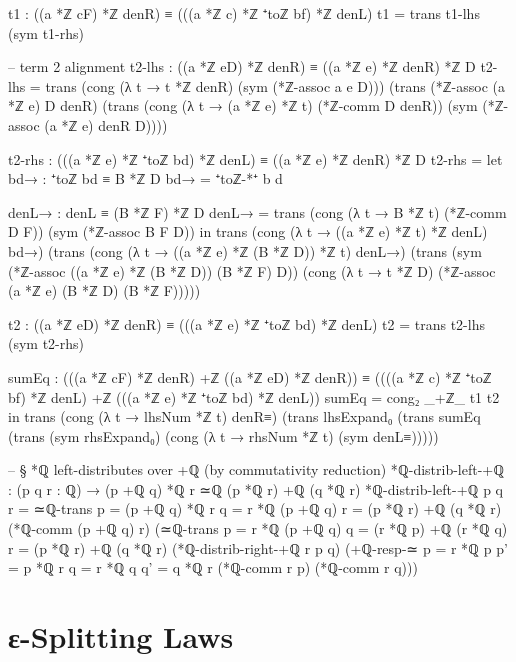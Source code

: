 \documentclass[11pt,a4paper]{book}
\def\texorpdfstring#1#2{#2}%
\begin{document}
\begin{code}
    t1 : ((a *ℤ cF) *ℤ denR) ≡ (((a *ℤ c) *ℤ ⁺toℤ bf) *ℤ denL)
    t1 = trans t1-lhs (sym t1-rhs)

    -- term 2 alignment
    t2-lhs : ((a *ℤ eD) *ℤ denR) ≡ ((a *ℤ e) *ℤ denR) *ℤ D
    t2-lhs =
      trans
          (cong (λ t → t *ℤ denR) (sym (*ℤ-assoc a e D)))
          (trans
            (*ℤ-assoc (a *ℤ e) D denR)
            (trans
              (cong (λ t → (a *ℤ e) *ℤ t) (*ℤ-comm D denR))
              (sym (*ℤ-assoc (a *ℤ e) denR D))))

    t2-rhs : (((a *ℤ e) *ℤ ⁺toℤ bd) *ℤ denL) ≡ ((a *ℤ e) *ℤ denR) *ℤ D
    t2-rhs =
      let
        bd→ : ⁺toℤ bd ≡ B *ℤ D
        bd→ = ⁺toℤ-*⁺ b d

        denL→ : denL ≡ (B *ℤ F) *ℤ D
        denL→ =
          trans
            (cong (λ t → B *ℤ t) (*ℤ-comm D F))
            (sym (*ℤ-assoc B F D))
      in
      trans
        (cong (λ t → ((a *ℤ e) *ℤ t) *ℤ denL) bd→)
        (trans
          (cong (λ t → ((a *ℤ e) *ℤ (B *ℤ D)) *ℤ t) denL→)
          (trans
            (sym (*ℤ-assoc ((a *ℤ e) *ℤ (B *ℤ D)) (B *ℤ F) D))
            (cong (λ t → t *ℤ D) (*ℤ-assoc (a *ℤ e) (B *ℤ D) (B *ℤ F)))))

    t2 : ((a *ℤ eD) *ℤ denR) ≡ (((a *ℤ e) *ℤ ⁺toℤ bd) *ℤ denL)
    t2 = trans t2-lhs (sym t2-rhs)

    sumEq : (((a *ℤ cF) *ℤ denR) +ℤ ((a *ℤ eD) *ℤ denR)) ≡ ((((a *ℤ c) *ℤ ⁺toℤ bf) *ℤ denL) +ℤ (((a *ℤ e) *ℤ ⁺toℤ bd) *ℤ denL))
    sumEq = cong₂ _+ℤ_ t1 t2
  in
  trans
    (cong (λ t → lhsNum *ℤ t) denR≡)
    (trans
      lhsExpand₀
      (trans
        sumEq
        (trans
          (sym rhsExpand₀)
          (cong (λ t → rhsNum *ℤ t) (sym denL≡)))))

-- § *ℚ left-distributes over +ℚ (by commutativity reduction)
*ℚ-distrib-left-+ℚ : (p q r : ℚ) → (p +ℚ q) *ℚ r ≃ℚ (p *ℚ r) +ℚ (q *ℚ r)
*ℚ-distrib-left-+ℚ p q r =
  ≃ℚ-trans
    {p = (p +ℚ q) *ℚ r}
    {q = r *ℚ (p +ℚ q)}
    {r = (p *ℚ r) +ℚ (q *ℚ r)}
    (*ℚ-comm (p +ℚ q) r)
    (≃ℚ-trans
      {p = r *ℚ (p +ℚ q)}
      {q = (r *ℚ p) +ℚ (r *ℚ q)}
      {r = (p *ℚ r) +ℚ (q *ℚ r)}
      (*ℚ-distrib-right-+ℚ r p q)
      (+ℚ-resp-≃
        {p = r *ℚ p}
        {p' = p *ℚ r}
        {q = r *ℚ q}
        {q' = q *ℚ r}
        (*ℚ-comm r p)
        (*ℚ-comm r q)))
\end{code}

\section{\texorpdfstring{$\varepsilon$}{ε}-Splitting Laws}
\end{document}
